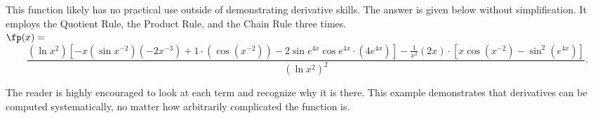 {This function likely has no practical use outside of demonstrating derivative skills. The answer is given below without simplification. It employs the Quotient Rule, the Product Rule, and the Chain Rule three times.\\
\scriptsize
$\fp(x) = $\\
\[
 \dfrac{(\ln x^2)[-x(\sin x^{-2})(-2x^{-3}) + 1\cdot (\cos (x^{-2})) -2 \sin e^{4x} \cos e^{4x} \cdot (4e^{4x})] - \frac{1}{x^2} (2x) \cdot [x\cos (x^{-2}) -\sin^2(e^{4x})]}
 {(\ln x^2)^2}.
\]%
\normalsize

The reader is highly encouraged to look at each term and recognize why it is there. %
This example demonstrates that derivatives can be computed systematically, no matter how arbitrarily complicated the function is.}

